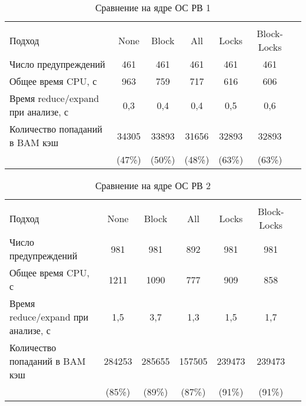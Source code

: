   \begin{table}[h]\footnotesize \centering
    \caption{Сравнение на ядре ОС РВ 1}
  	\label{table-os-lock-reduce-1}
    \begin{tabular}{ | l | c | c | c | c | c | c | }
      \hline
      		& 		\multicolumn{5}{c|}{\combatmode}  \\
      Подход         						& None 			& Block 	& All		& Locks 	& Block-Locks	\\ \hline
      Число предупреждений 					& 461   		& 461       & 461   	& 461   	& 461       	\\ 
      Общее время CPU, с 					& 963 			& 759 		& 717   	& 616 		& 606 	 		\\ 
\hspace{0.5cm} Время reduce/expand при анализе, с & 0,3		& 0,4 		& 0,4   	& 0,5 		& 0,6 	  		\\ \hline
      Количество попаданий в BAM кэш		& 34305  		& 33893   	& 31656   	& 32893  	& 32893  	\\ 
      										& (47\%)		& (50\%)  	& (48\%)	& (63\%)	& (63\%)	\\
      \hline
    \end{tabular}
  \end{table}

  \begin{table}[h]\footnotesize \centering
    \caption{Сравнение на ядре ОС РВ 2}
  	\label{table-os-lock-reduce-2}
    \begin{tabular}{ | l | c | c | c | c | c | c | }
      \hline
      		& 		\multicolumn{5}{c|}{\combatmode}  \\
      Подход         						& None 		& Block 	& All 		& Locks 	& Block-Locks 	\\ \hline %
      Число предупреждений 					& 981  		& 981      	& 892   	& 981   	& 981  		\\ %
      Общее время CPU, с 					& 1211 		& 1090 		& 777   	& 909 		& 858 			\\ %
\hspace{0.5cm} Время reduce/expand
 							при анализе, с	& 1,5 		& 3,7 		& 1,3   	& 1,5 		& 1,7 	 		\\ \hline %
      Количество попаданий в BAM кэш		& 284253  	& 285655  	& 157505   	& 239473  	& 239473  		\\ %
      										& (85\%)	& (89\%)	& (87\%)	& (91\%) 	& (91\%) 		\\ %
      \hline
    \end{tabular}
  \end{table}

